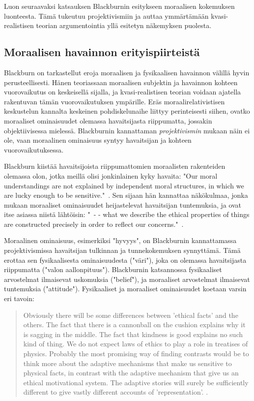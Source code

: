 \documentclass[a4paper,12pt,times,titlepage,finnish]{article}
\begin{document}
Luon seuraavaksi katsauksen Blackburnin esitykseen moraalisen kokemuksen luonteesta. Tä\-mä tukeutuu projektivismiin ja auttaa ymmärtämään kvasi-\-realistisen teorian argumentointia yllä esitetyn näkemyksen puolesta.

\subsection{Moraalisen havainnon erityispiirteistä}

Blackburn on tarkastellut eroja moraalisen ja fysikaalisen havainnon välillä hyvin perusteellisesti.  Hänen teoriassaan moraalisen subjektin ja havainnon kohteen vuorovaikutus on keskeisellä sijalla, ja kvasi-\-realistisen teorian voidaan ajatella rakentuvan tä\-män vuorovaikutuksen ympärille. Eräs moraalirelativistisen keskustelun kannalta keskeinen pohdiskelunaihe liittyy perinteisesti siihen, ovatko moraaliset ominaisuudet olemassa havaitsijasta riippumatta, jossakin objektiivisessa mielessä. Blackburnin kannattaman {\it projektivismin} mukaan näin ei ole, vaan moraalinen ominaisuus syntyy havaitsijan ja kohteen vuorovaikutuksessa. 

Blackburn kiistää havaitsijoista riippumattomien moraalisten rakenteiden olemassa olon, jotka meillä olisi jonkinlainen kyky havaita: "Our moral understandings are not explained by independent moral structures, in which we are lucky enough to be sensitive."\ \citep[216-217]{Blackburn99}. Sen sijaan hän kannattaa näkökulmaa, jonka mukaan moraaliset ominaisuudet heijastelevat havaitsijan tuntemuksia, ja ovat itse asiassa niistä lähtöisin: "\ - - what we describe the ethical properties of things are constructed precisely in order to reflect our concerns."\ \citep[80]{Blackburn98}. 

Moraalinen ominaisuus, esimerkiksi "hyvyys", on Blackburnin kannattamassa projektivismissa havaitsijan tulkinnan ja tunnekokemuksen synnyttämä. Tä\-mä erottaa sen fysikaalisesta ominaisuudesta ("väri"), joka on olemassa havaitsijasta riippumatta ("valon aallonpituus"). 
Blackburnin katsannossa fysikaaliset arvostelmat ilmaisevat uskomuksia ("belief"), ja moraaliset arvostelmat ilmaisevat tuntemuksia ("attitude"). Fysikaaliset ja moraaliset ominaisuudet koetaan varsin eri tavoin:

\begin{quote}
	Obviously there will be some differences between 'ethical facts' and the others. The fact that there is a cannonball on the cushion explains why it is sagging in the middle. The fact that kindness is good explains no such kind of thing. We do not expect laws of ethics to play a role in treatises of physics. Probably the most promising way of finding contrasts would be to think more about the adaptive mechanisms that make us sensitive to physical facts, in contrast with the adaptive mechanism that give us an ethical motivational system. The adaptive stories will surely be sufficiently different to give vastly different accounts of 'representation'. \citep[80]{Blackburn98}.
\end{quote}
\end{document}
